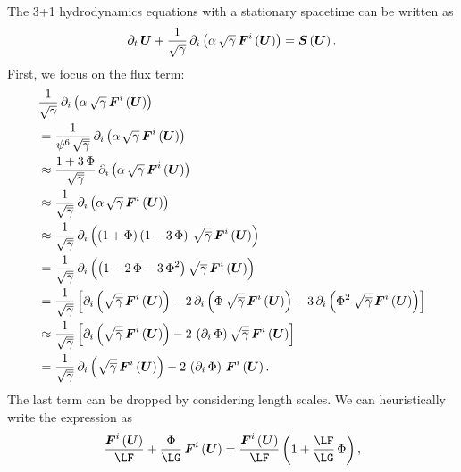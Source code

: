 The 3+1 hydrodynamics equations with a stationary spacetime can be written as
\citep{rz2013}
\begin{equation}
  \partial_{t}\,\boldsymbol{U}
  +\frac{1}{\sqrt{\gamma}}\,
  \partial_{i}\left(\alpha\,\sqrt{\gamma}\,\boldsymbol{F}^{i}\left(\boldsymbol{U}\right)\right)
  =\boldsymbol{S}\left(\boldsymbol{U}\right).
\end{equation}
First, we focus on the flux term:
\begin{align}
  &\frac{1}{\sqrt{\gamma}}\,
  \partial_{i}\left(\alpha\,\sqrt{\gamma}\,\boldsymbol{F}^{i}\left(\boldsymbol{U}\right)\right) \\
  &=\frac{1}{\psi^{6}\,\sqrt{\overline{\gamma}}}\,
  \partial_{i}\left(\alpha\,\sqrt{\gamma}\,\boldsymbol{F}^{i}\left(\boldsymbol{U}\right)\right) \\
  &\approx\frac{1+3\,\Phi}{\sqrt{\overline{\gamma}}}\,
  \partial_{i}\left(\alpha\,\sqrt{\gamma}\,\boldsymbol{F}^{i}\left(\boldsymbol{U}\right)\right) \\
  &\approx\frac{1}{\sqrt{\overline{\gamma}}}\,
  \partial_{i}\left(\alpha\,\sqrt{\gamma}\,\boldsymbol{F}^{i}\left(\boldsymbol{U}\right)\right) \\
  &\approx\frac{1}{\sqrt{\overline{\gamma}}}\,
  \partial_{i}\left(\left(1+\Phi\right)\left(1-3\,\Phi\right)\,\sqrt{\overline{\gamma}}\,
  \boldsymbol{F}^{i}\left(\boldsymbol{U}\right)\right) \\
  &=\frac{1}{\sqrt{\overline{\gamma}}}\,
  \partial_{i}\left(\left(1-2\,\Phi-3\,\Phi^{2}\right)\sqrt{\overline{\gamma}}\,
  \boldsymbol{F}^{i}\left(\boldsymbol{U}\right)\right) \\
  &=\frac{1}{\sqrt{\overline{\gamma}}}\left[
  \partial_{i}\left(\sqrt{\overline{\gamma}}\,
    \boldsymbol{F}^{i}\left(\boldsymbol{U}\right)\right)
  -2\,\partial_{i}\left(\Phi\,\sqrt{\overline{\gamma}}\,
    \boldsymbol{F}^{i}\left(\boldsymbol{U}\right)\right)
  -3\,\partial_{i}\left(\Phi^{2}\,\sqrt{\overline{\gamma}}\,
    \boldsymbol{F}^{i}\left(\boldsymbol{U}\right)\right)\right] \\
  &\approx\frac{1}{\sqrt{\overline{\gamma}}}\left[
  \partial_{i}\left(\sqrt{\overline{\gamma}}\,
    \boldsymbol{F}^{i}\left(\boldsymbol{U}\right)\right)
  -2\,\left(\partial_{i}\,\Phi\right)
  \sqrt{\overline{\gamma}}\,\boldsymbol{F}^{i}\left(\boldsymbol{U}\right)\right] \\
  &=\frac{1}{\sqrt{\overline{\gamma}}}\,
  \partial_{i}\left(\sqrt{\overline{\gamma}}\,
    \boldsymbol{F}^{i}\left(\boldsymbol{U}\right)\right)
  -2\,\left(\partial_{i}\,\Phi\right)\,
  \boldsymbol{F}^{i}\left(\boldsymbol{U}\right).
\end{align}
The last term can be dropped by considering length scales.
We can heuristically write the expression as
\begin{equation}
  \frac{\bs{F}^{i}\left(\bs{U}\right)}{\LF}
  +\frac{\Phi}{\LG}\,\bs{F}^{i}\left(\bs{U}\right)
  =\frac{\bs{F}^{i}\left(\bs{U}\right)}{\LF}
  \left(1+\frac{\LF}{\LG}\,\Phi\right),
\end{equation}

